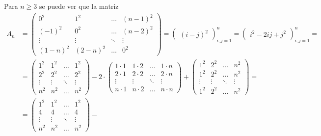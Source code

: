 \documentclass[../../main.tex]{subfiles}
\begin{document}
  Para $n \geq 3$ se puede ver que la matriz
  \begin{equation*}
    \begin{split}
      A_n & = \begin{pmatrix}
        0^2 & 1^2 & \dots & (n - 1)^2 \\
        (-1)^2 & 0^2 & \dots & (n - 2)^2 \\
        \vdots & \vdots & \ddots & \vdots \\
        (1 - n)^2 & (2 - n)^2 & \dots & 0^2
      \end{pmatrix} =
      \begin{pmatrix} (i - j)^2 \end{pmatrix}_{i, j = 1}^n =
      \begin{pmatrix} i^2 - 2ij + j^2 \end{pmatrix}_{i, j = 1}^n
      = \\ & =
      \begin{pmatrix}
        1^2 & 1^2 & \dots & 1^2 \\
        2^2 & 2^2 & \dots & 2^2 \\
        \vdots & \vdots & \ddots & \vdots \\
        n^2 & n^2 & \dots & n^2
      \end{pmatrix} -
      2 \cdot \begin{pmatrix}
        1 \cdot 1 & 1 \cdot 2 & \dots & 1 \cdot n \\
        2 \cdot 1 & 2 \cdot 2 & \dots & 2 \cdot n \\
        \vdots & \vdots & \ddots & \vdots \\
        n \cdot 1 & n \cdot 2 & \dots & n \cdot n
      \end{pmatrix} +
      \begin{pmatrix}
        1^2 & 2^2 & \dots & n^2 \\
        1^2 & 2^2 & \dots & n^2 \\
        \vdots & \vdots & \ddots & \vdots \\
        1^2 & 2^2 & \dots & n^2
      \end{pmatrix}
      = \\ & =
      \begin{pmatrix}
        1^2 & 1^2 & \dots & 1^2 \\
        4 & 4 & \dots & 4 \\
        \vdots & \vdots & \ddots & \vdots \\
        n^2 & n^2 & \dots & n^2
      \end{pmatrix} -

\end{split}
\end{equation*}
\end{document}
